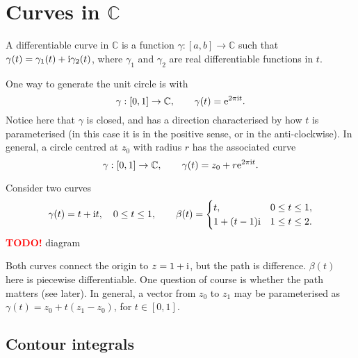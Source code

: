 \documentclass[letter-paper]{tufte-book}
\newcommand{\TODO}{\textcolor{red}{\bf TODO!}\xspace}
\newenvironment{example}[1][Example]{\begin{trivlist}
\item[\hskip \labelsep {\bfseries #1}]}{\end{trivlist}}
\newcommand{\ex}{\mathrm{e}}
\newcommand{\zi}{{\rm i}}
\begin{document}

\section{Curves in $\mathbb{C}$}

A differentiable curve in $\mathbb{C}$ is a function $\gamma : [a, b] \to
\mathbb{C}$ such that $\gamma(t) = \gamma_1(t) + \zi \gamma_2 (t)$, where
$\gamma_1$ and $\gamma_2$ are real differentiable functions in $t$.

\begin{example}
  One way to generate the unit circle is with
  \begin{equation*}
    \gamma : [0, 1] \to \mathbb{C}, \qquad \gamma(t) = \ex^{2\pi \zi t}.
  \end{equation*}
  Notice here that $\gamma$ is closed, and has a direction characterised by how
  $t$ is parameterised (in this case it is in the positive sense, or in the
  anti-clockwise). In general, a circle centred at $z_0$ with radius $r$ has the
  associated curve
  \begin{equation*}
    \gamma : [0, 1] \to \mathbb{C}, \qquad \gamma(t) = z_0 + r \ex^{2\pi \zi t}.
  \end{equation*}
\end{example}

\begin{example}
  Consider two curves
  \begin{equation*}
    \gamma(t) = t + \zi t, \quad 0 \leq t \leq 1, \qquad \beta(t) = \begin{cases}t, & 0 \leq t \leq 1, \\ 1 + (t-1)\zi & 1 \leq t \leq 2. \end{cases}
  \end{equation*}
  \TODO diagram
  
  Both curves connect the origin to $z = 1 + \zi$, but the path is difference.
  $\beta(t)$ here is piecewise differentiable. One question of course is whether
  the path matters (see later). In general, a vector from $z_0$ to $z_1$ may be
  parameterised as $\gamma(t) = z_0 + t (z_1 - z_0)$, for $t \in [0, 1]$.
\end{example}


\subsection{Contour integrals}
\end{document}
